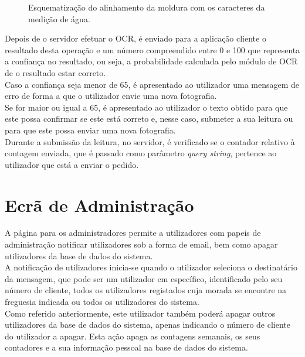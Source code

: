 \begin{figure}[h!]
\begin{center}
\caption{Esquematização do alinhamento da moldura com os caracteres da medição de água.}
\label{fig:moldura}
\end{center}
\end{figure}

Depois de o servidor efetuar o OCR, é enviado para a aplicação cliente o resultado desta operação e um número compreendido entre 0 e 100 que representa a confiança no resultado, ou seja, a probabilidade calculada pelo módulo de OCR de o resultado estar correto.\\
Caso a confiança seja menor de 65, é apresentado ao utilizador uma mensagem de erro de forma a que o utilizador envie uma nova fotografia.\\
Se for maior ou igual a 65, é apresentado ao utilizador o texto obtido para que este possa confirmar se este está correto e, nesse caso, submeter a sua leitura ou para que este possa enviar uma nova fotografia.\\
Durante a submissão da leitura, no servidor, é verificado se o contador relativo à contagem enviada, que é passado como parâmetro \textit{query string}, pertence ao utilizador que está a enviar o pedido.

\section{Ecrã de Administração} \label{ecra:admin} %
A página para os administradores permite a utilizadores com papeis de administração notificar utilizadores sob a forma de email, bem como apagar utilizadores da base de dados do sistema.\\
A notificação de utilizadores inicia-se quando o utilizador seleciona o destinatário da mensagem, que pode ser um utilizador em específico, identificado pelo seu número de cliente, todos os utilizadores registados cuja morada se encontre na freguesia indicada ou todos os utilizadores do sistema.\\
Como referido anteriormente, este utilizador também poderá apagar outros utilizadores da base de dados do sistema, apenas indicando o número de cliente do utilizador a apagar. Esta ação apaga as contagens semanais, os seus contadores e a sua informação pessoal na base de dados do sistema.


